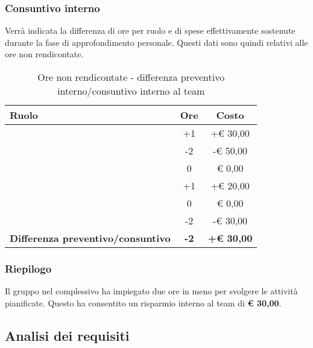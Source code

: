 		\subsubsection{Consuntivo interno} %
		\label{ssub:consuntivo}
		Verrà indicata la differenza di ore per ruolo e di spese effettivamente sostenute durante la fase di approfondimento personale. Questi dati sono quindi relativi alle ore non rendicontate.
		\begin{table}[!h]
			\begin{center}
				\begin{tabularx}{0.75\textwidth}{|X|c|c|}
					\hline
					\textbf{Ruolo} & \textbf{Ore} & \textbf{Costo} \\
					\hline
					\roleProjectManager & +1 & +\euro{} 30,00 \\
					\hline
					\roleAnalyst & -2 & -\euro{} 50,00 \\
					\hline
					\roleDesigner & 0 & \euro{} 0,00 \\
					\hline
					\roleAdministrator & +1 & +\euro{} 20,00 \\
					\hline
					\roleProgrammer & 0 & \euro{} 0,00 \\
					\hline
					\roleVerifier & -2 & -\euro{} 30,00 \\
					\hline
					\textbf{Differenza preventivo/consuntivo} & \textbf{-2} & \textbf{+\euro{} 30,00} \\
					\hline
				\end{tabularx}
			\end{center}
		\caption{Ore non rendicontate - differenza preventivo interno/consuntivo interno al team}
		\end{table}

		\subsubsection{Riepilogo} %
		\label{ssub:riepilogo}
		Il gruppo nel complessivo ha impiegato due ore in meno per svolgere le attività pianificate. \newline
		Questo ha consentito un risparmio interno al team di \textbf{\euro{} 30,00}.

	\newpage
	\subsection{Analisi dei requisiti} %
	\label{sub:analisi_dei_requisiti}
